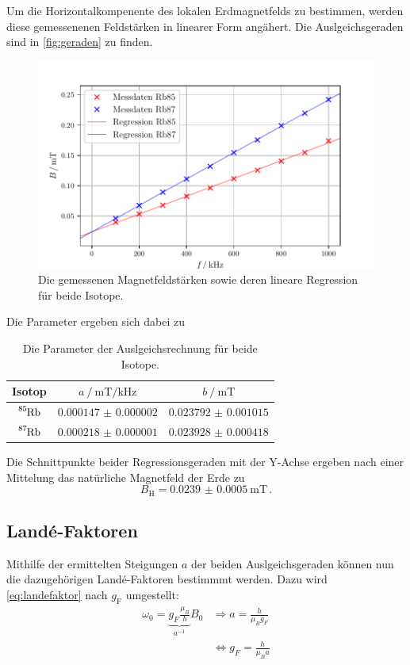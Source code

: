 Um die Horizontalkompenente des lokalen Erdmagnetfelds zu bestimmen,
werden diese gemessenenen Feldstärken in linearer Form angähert. 
Die Auslgeichsgeraden sind in \autoref{fig:geraden} zu finden.
\begin{figure}
    \centering
    \includegraphics[width = 0.8\linewidth]{build/geraden.pdf}
    \caption{Die gemessenen Magnetfeldstärken sowie deren lineare Regression für beide Isotope.}
    \label{fig:geraden}
\end{figure}
Die Parameter ergeben sich dabei zu 
\begin{table}
    \centering
    \caption{Die Parameter der Auslgeichsrechnung für beide Isotope.}
    \begin{tabular}{c c c}
        \toprule 
        Isotop &
        $a \mathbin{/} \unit{\milli\tesla\per\kilo\hertz}$ &
        $b \mathbin{/} \unit{\milli\tesla}$ \\
        \midrule
        $\ce{^{85}_{}Rb}$ & $\num{0.000147(2)}$ & $\num{0.023792(1015)}$ \\
        $\ce{^{87}_{}Rb}$ & $\num{0.000218(1)}$ & $\num{0.023928(418)}$ \\
        \bottomrule
    \end{tabular}
\end{table}

Die Schnittpunkte beider Regressionsgeraden mit der Y-Achse ergeben
nach einer Mittelung das natürliche Magnetfeld der Erde zu
\begin{equation*}
    B_\text{H} = \qty{0.0239(5)}{\milli\tesla} \, .
\end{equation*}


\subsection{Landé-Faktoren}

Mithilfe der ermittelten Steigungen $a$ der beiden Auslgeichsgeraden können nun
die dazugehörigen Landé-Faktoren bestimmmt werden.
Dazu wird \autoref{eq:landefaktor} nach $g_\text{F}$ umgestellt:
\begin{equation*}
    \begin{aligned}
    \omega_0=\underbrace{g_F \frac{\mu_B}{h}}_{a^{-1}} B_0 & \Rightarrow a=\frac{h}{\mu_B g_F} \\
    & \Leftrightarrow g_F=\frac{h}{\mu_B a}
    \end{aligned}
\end{equation*}

